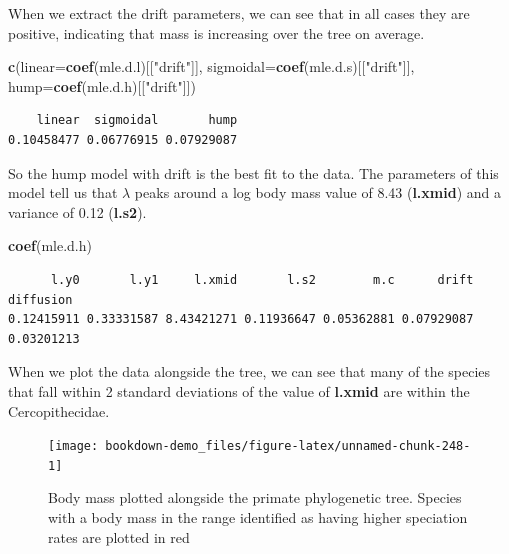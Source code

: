 \documentclass[
]{book}
\newenvironment{Shaded}{\begin{snugshade}}{\end{snugshade}}
\newcommand{\DataTypeTok}[1]{\textcolor[rgb]{0.13,0.29,0.53}{#1}}
\newcommand{\KeywordTok}[1]{\textcolor[rgb]{0.13,0.29,0.53}{\textbf{#1}}}
\newcommand{\NormalTok}[1]{#1}
\newcommand{\StringTok}[1]{\textcolor[rgb]{0.31,0.60,0.02}{#1}}
\begin{document}
When we extract the drift parameters, we can see that in all cases they are positive, indicating that mass is increasing over the tree on average.

\begin{Shaded}
\begin{Highlighting}[]
\KeywordTok{c}\NormalTok{(}\DataTypeTok{linear=}\KeywordTok{coef}\NormalTok{(mle.d.l)[[}\StringTok{"drift"}\NormalTok{]], }
  \DataTypeTok{sigmoidal=}\KeywordTok{coef}\NormalTok{(mle.d.s)[[}\StringTok{"drift"}\NormalTok{]], }
  \DataTypeTok{hump=}\KeywordTok{coef}\NormalTok{(mle.d.h)[[}\StringTok{"drift"}\NormalTok{]])}
\end{Highlighting}
\end{Shaded}

\begin{verbatim}
    linear  sigmoidal       hump 
0.10458477 0.06776915 0.07929087 
\end{verbatim}

So the hump model with drift is the best fit to the data. The parameters of this model tell us that \(\lambda\) peaks around a log body mass value of 8.43 (\textbf{l.xmid}) and a variance of 0.12 (\textbf{l.s2}).

\begin{Shaded}
\begin{Highlighting}[]
\KeywordTok{coef}\NormalTok{(mle.d.h)}
\end{Highlighting}
\end{Shaded}

\begin{verbatim}
      l.y0       l.y1     l.xmid       l.s2        m.c      drift  diffusion 
0.12415911 0.33331587 8.43421271 0.11936647 0.05362881 0.07929087 0.03201213 
\end{verbatim}

When we plot the data alongside the tree, we can see that many of the species that fall within 2 standard deviations of the value of \textbf{l.xmid} are within the Cercopithecidae.

\begin{figure}[H]

{\centering \texttt{[image: bookdown-demo\_files/figure-latex/unnamed-chunk-248-1]} 

}

\caption{Body mass plotted alongside the primate phylogenetic tree. Species with a body mass in the range identified as having higher speciation rates are plotted in red}\label{fig:unnamed-chunk-248}
\end{figure}
\end{document}
